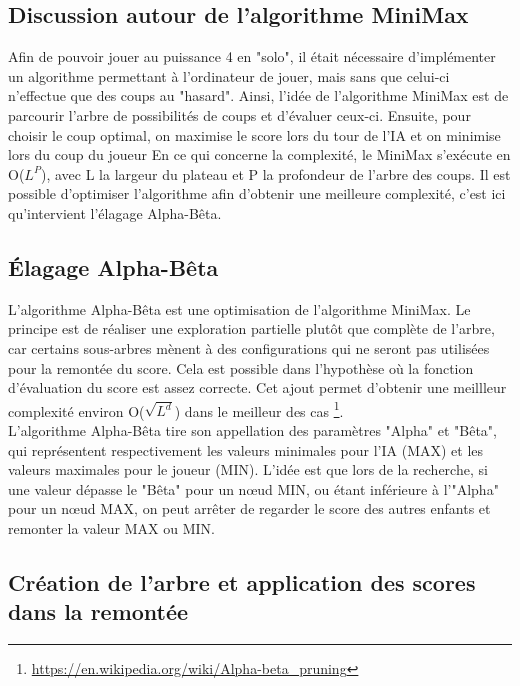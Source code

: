 \documentclass[a4paper,fleqn]{article}
\begin{document}
\subsection{Discussion autour de l'algorithme MiniMax}

Afin de pouvoir jouer au puissance 4 en "solo", il était nécessaire d'implémenter un algorithme permettant à l'ordinateur de jouer, mais sans que celui-ci n'effectue que des coups au "hasard". Ainsi, l'idée de l'algorithme MiniMax est de parcourir l'arbre de possibilités de coups et d'évaluer ceux-ci. Ensuite, pour choisir le coup optimal, on maximise le score lors du tour de l'IA et on minimise lors du coup du joueur  En ce qui concerne la complexité, le MiniMax s'exécute en O($L^P$), avec L la largeur du plateau et P la profondeur de l'arbre des coups. Il est possible d'optimiser l'algorithme afin d'obtenir une meilleure complexité, c'est ici qu'intervient l'élagage Alpha-Bêta.

\subsection{Élagage Alpha-Bêta}

L'algorithme Alpha-Bêta est une optimisation de l'algorithme MiniMax. Le principe est de réaliser une exploration partielle plutôt que complète de l'arbre, car certains sous-arbres mènent à des configurations qui ne seront pas utilisées pour la remontée du score. Cela est possible dans l'hypothèse où la fonction d'évaluation du score est assez correcte. Cet ajout permet d'obtenir une meillleur complexité environ O($\sqrt{L^d}$) dans le meilleur des cas \footnote{\url{https://en.wikipedia.org/wiki/Alpha-beta_pruning}}.\\

L'algorithme Alpha-Bêta tire son appellation des paramètres "Alpha" et "Bêta", qui représentent respectivement les valeurs minimales pour l'IA (MAX) et les valeurs maximales pour le joueur (MIN). L'idée est que lors de la recherche, si une valeur dépasse le "Bêta" pour un nœud MIN, ou étant inférieure à l'"Alpha" pour un nœud MAX, on peut arrêter de regarder le score des autres enfants et remonter la valeur MAX ou MIN.\\

\pagebreak

\subsection{Création de l'arbre et application des scores dans la remontée}
\end{document}
